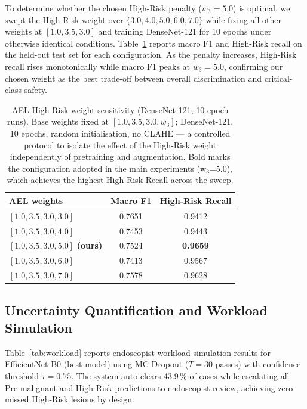 \documentclass[11pt,a4paper]{article}
\begin{document}
To determine whether the chosen High-Risk penalty ($w_3 = 5.0$) is optimal,
we swept the High-Risk weight over $\{3.0, 4.0, 5.0, 6.0, 7.0\}$ while
fixing all other weights at $[1.0, 3.5, 3.0]$ and training DenseNet-121 for
10 epochs under otherwise identical conditions. Table~\ref{tab:ael_sensitivity}
reports macro F1 and High-Risk recall on the held-out test set for each
configuration. As the penalty increases, High-Risk recall rises monotonically
while macro F1 peaks at $w_3 = 5.0$, confirming our chosen weight as the
best trade-off between overall discrimination and critical-class safety.

\begin{table}[H]
\centering
\caption{AEL High-Risk weight sensitivity (DenseNet-121, 10-epoch runs).
  Base weights fixed at $[1.0, 3.5, 3.0, w_3]$; DenseNet-121, 10 epochs,
  random initialisation, no CLAHE — a controlled protocol to isolate the
  effect of the High-Risk weight independently of pretraining and augmentation.
  Bold marks the configuration adopted in the main experiments (w$_3$=5.0),
  which achieves the highest High-Risk Recall across the sweep.}
\label{tab:ael_sensitivity}
\begin{tabular}{lcc}
\toprule
\textbf{AEL weights} & \textbf{Macro F1} & \textbf{High-Risk Recall}\\
\midrule
$[1.0, 3.5, 3.0, 3.0]$ & 0.7651 & 0.9412\\
$[1.0, 3.5, 3.0, 4.0]$ & 0.7453 & 0.9443\\
$\mathbf{[1.0, 3.5, 3.0, 5.0]}$ \textbf{(ours)} & 0.7524 & \textbf{0.9659}\\
$[1.0, 3.5, 3.0, 6.0]$ & 0.7413 & 0.9567\\
$[1.0, 3.5, 3.0, 7.0]$ & 0.7578 & 0.9628\\
\bottomrule
\end{tabular}
\end{table}

\subsection{Uncertainty Quantification and Workload Simulation}

Table~\ref{tab:workload} reports endoscopist workload simulation results for
EfficientNet-B0 (best model) using MC Dropout ($T=30$ passes) with confidence
threshold $\tau=0.75$. The system auto-clears 43.9\,\% of cases while
escalating all Pre-malignant and High-Risk predictions to endoscopist review,
achieving zero missed High-Risk lesions by design.
\end{document}
